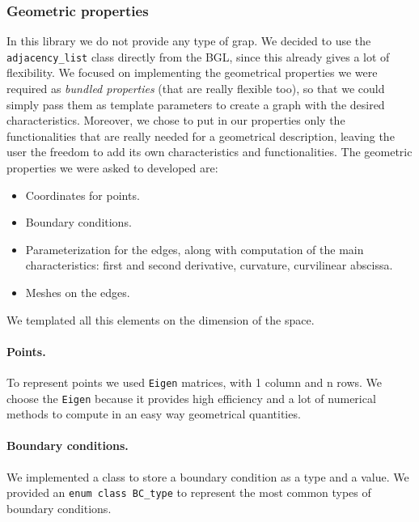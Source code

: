 \documentclass[11pt]{article} %
\newcommand{\classname}[1]{\texttt{#1}}
\begin{document}
	
		\subsubsection{Geometric properties}
		In this library we do not provide any type of grap. We decided to use the \classname{adjacency\_list} class directly from the BGL, since this already gives a lot of flexibility. We focused on implementing the geometrical properties we were required as \textit{bundled properties} (that are really flexible too), so that we could simply pass them as template parameters to create a graph with the desired characteristics. Moreover, we chose to put in our properties only the functionalities that are really needed for a geometrical description, leaving the user the freedom to add its own characteristics and functionalities. \newline
		The geometric properties we were asked to developed are:
		\begin{itemize}
			\item Coordinates for points.
			\item Boundary conditions.
			\item Parameterization for the edges, along with computation of the main characteristics: first and second derivative, curvature, curvilinear abscissa.
			\item Meshes on the edges.
		\end{itemize}
		We templated all this elements on the dimension of the space.				
		\paragraph{Points.}	To represent points we used \texttt{Eigen} matrices, with 1 column and n rows. We choose the \texttt{Eigen} because it provides high efficiency and a lot of numerical methods to compute in an easy way geometrical quantities.
		\paragraph{Boundary conditions.} We implemented a class to store a boundary condition as a type and a value. We provided an \texttt{enum class BC\_type} to represent the most common types of boundary conditions.
\end{document}
